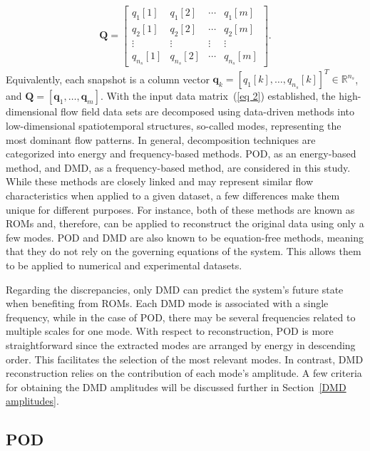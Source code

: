 \documentclass[a4paper,fleqn]{cas-sc}
\begin{document}
	\begin{align}
		\mathbf{Q} = \begin{bmatrix}
			q_{1}[1] & q_{1}[2] & \cdots & q_{1}[m] \\
			q_{2}[1] & q_{2}[2] & \cdots & q_{2}[m] \\
			\vdots & \vdots & \vdots & \vdots \\
			q_{n_s}[1] & q_{n_s}[2] & \cdots & q_{n_s}[m]
		\end{bmatrix}.\label{eq 2}
	\end{align}
	\noindent Equivalently, each snapshot is a column vector $\mathbf{q}_k=[q_1[k],\ldots,q_{n_s}[k]]^T\in\mathbb{R}^{n_s}$, and $\mathbf{Q}=[\mathbf{q}_1,\ldots,\mathbf{q}_m]$.
	\noindent With the input data matrix~(\ref{eq 2}) established, the high-dimensional flow field data sets are decomposed using data-driven methods into low-dimensional spatiotemporal structures, so-called modes, representing the most dominant flow patterns. In general, decomposition techniques are categorized into energy and frequency-based methods. POD, as an energy-based method, and DMD, as a frequency-based method, are considered in this study. While these methods are closely linked and may represent similar flow characteristics when applied to a given dataset, a few differences make them unique for different purposes. For instance, both of these methods are known as ROMs and, therefore, can be applied to reconstruct the original data using only a few modes. POD and DMD are also known to be equation-free methods, meaning that they do not rely on the governing equations of the system. This allows them to be applied to numerical and experimental datasets.
	
	Regarding the discrepancies, only DMD can predict the system's future state when benefiting from ROMs. Each DMD mode is associated with a single frequency, while in the case of POD, there may be several frequencies related to multiple scales for one mode. With respect to reconstruction, POD is more straightforward since the extracted modes are arranged by energy in descending order. This facilitates the selection of the most relevant modes. In contrast, DMD reconstruction relies on the contribution of each mode's amplitude. A few criteria for obtaining the DMD amplitudes will be discussed further in Section~\ref{DMD amplitudes}.  
	
	\subsection{POD}
	\label{POD}
	
\end{document}
